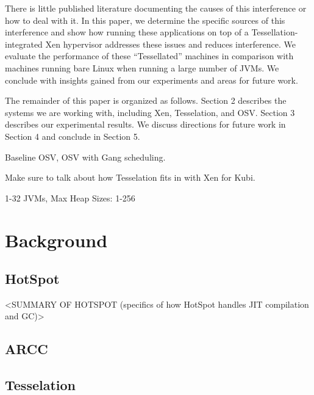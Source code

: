 \documentclass{sig-alternate}
\begin{document}
There is little published literature documenting the causes of this interference or how to deal with it. In this paper, we determine the specific sources of this interference and show how running these applications on top of a Tessellation-integrated Xen hypervisor addresses these issues and reduces interference. We evaluate the performance of these “Tessellated” machines in comparison with machines running bare Linux when running a large number of JVMs. We conclude with insights gained from our experiments and areas for future work.

The remainder of this paper is organized as follows. Section 2 describes the systems we are working with, including Xen, Tesselation, and OSV. Section 3 describes our experimental results. We discuss directions for future work in Section 4 and conclude in Section 5.

Baseline OSV, OSV with Gang scheduling.

Make sure to talk about how Tesselation fits in with Xen for Kubi.

1-32 JVMs, Max Heap Sizes: 1-256

\section{Background}

\subsection{HotSpot}

<SUMMARY OF HOTSPOT (specifics of how HotSpot handles JIT compilation and GC)>

\subsection{ARCC}

\subsection{Tesselation}

%
\end{document}
